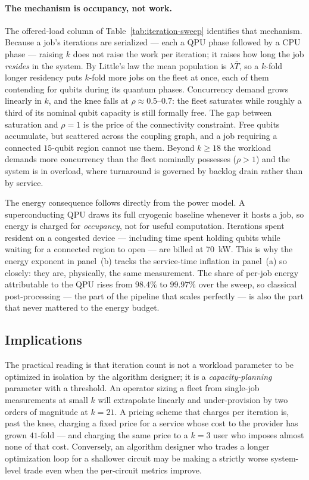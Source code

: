 \paragraph{The mechanism is occupancy, not work.}
The offered-load column of Table~\ref{tab:iteration-sweep} identifies that
mechanism. Because a job's iterations are serialized --- each a QPU phase
followed by a CPU phase --- raising $k$ does not raise the work per iteration;
it raises how long the job \emph{resides} in the system. By Little's law the
mean population is $\lambda \bar{T}$, so a $k$-fold longer residency puts
$k$-fold more jobs on the fleet at once, each of them contending for qubits
during its quantum phases. Concurrency demand grows linearly in $k$, and the
knee falls at
$\rho \approx 0.5$--$0.7$: the fleet saturates while roughly a third of its
nominal qubit capacity is still formally free. The gap between saturation and
$\rho=1$ is the price of the connectivity constraint. Free qubits accumulate,
but scattered across the coupling graph, and a job requiring a connected
$15$-qubit region cannot use them. Beyond $k \geq 18$ the workload demands more
concurrency than the fleet nominally possesses ($\rho > 1$) and the system is
in overload, where turnaround is governed by backlog drain rather than by
service.

The energy consequence follows directly from the power model. A superconducting
QPU draws its full cryogenic baseline whenever it hosts a job, so energy is
charged for \emph{occupancy}, not for useful computation. Iterations spent
resident on a congested device --- including time spent holding qubits while
waiting for a connected region to open --- are billed at
\qty{70}{\kilo\watt}. This is why the energy exponent in panel~(b) tracks the
service-time inflation in panel~(a) so closely: they are, physically, the same
measurement. The share of per-job energy attributable to the QPU rises from
$98.4\%$ to $99.97\%$ over the sweep, so classical post-processing --- the part
of the pipeline that scales perfectly --- is also the part that never mattered
to the energy budget.

\subsection{Implications}
\label{sec:iter-implications}

The practical reading is that iteration count is not a workload parameter to be
optimized in isolation by the algorithm designer; it is a
\emph{capacity-planning} parameter with a threshold. An operator sizing a fleet
from single-job measurements at small $k$ will extrapolate linearly and
under-provision by two orders of magnitude at $k=21$. A pricing scheme that
charges per iteration is, past the knee, charging a fixed price for a service
whose cost to the provider has grown $41$-fold --- and charging the same price
to a $k=3$ user who imposes almost none of that cost. Conversely, an algorithm
designer who trades a longer optimization loop for a shallower circuit may be
making a strictly worse system-level trade even when the per-circuit metrics
improve.

